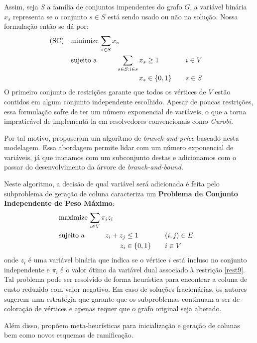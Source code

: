 \documentclass[11pt]{article}
\begin{document}
Assim, seja \(S\) a família de conjuntos impendentes do grafo \(G\), a variável binária \(x_s\) representa se o conjunto \(s \in S\) está sendo usado ou não na solução. Nossa formulação então se dá por:
\begin{alignat}{4}
\mathrm{(SC)} \quad & \omit\rlap{minimize  $\displaystyle \sum_{s \in S} x_s$} \nonumber \\
& \mbox{sujeito a}&& \quad & \sum_{s \in S: i \in s} x_{s}&\geq 1 & \quad & i \in V \label{rest9} \\
&                 &&   & x_s       & \in \{0,1\} &    & s \in S \nonumber
\end{alignat}
O primeiro conjunto de restrições garante que todos os vértices de \(V\) estão contidos em algum conjunto independente escolhido.
Apesar de poucas restrições, essa formulação sofre de ter um número exponencial de variáveis, o que a torna impraticável de implementá-la em resolvedores convencionais como \emph{Gurobi}.

Por tal motivo, \textcite{Mehrotra1996ColumnGenerationApproach} propuseram um algoritmo de \emph{branch-and-price} baseado nesta modelagem.
Essa abordagem permite lidar com um número exponencial de variáveis, já que iniciamos com um subconjunto destas e adicionamos com o passar do desenvolvimento da árvore de \emph{branch-and-bound}.

Neste algoritmo, a decisão de qual variável será adicionada é feita pelo subproblema de geração de coluna caracteriza um \textbf{Problema de Conjunto Independente de Peso Máximo}:
\begin{alignat*}{4}
& \omit\rlap{maximize  $\displaystyle \sum_{i \in V} \pi_i z_i$} \\
& \mbox{sujeito a}&& \quad & z_i + z_j &\leq 1 & \quad & (i,j) \in E \\
&                 &&   & z_i       & \in \{0,1\} &    & i \in V
\end{alignat*}
onde \(z_i\) é uma variável binária que indica se o vértice \(i\) está incluso no conjunto independente e \(\pi_i\) é o valor ótimo da variável dual associado à restrição \eqref{rest9}.
Tal problema pode ser resolvido de forma heurística para encontrar a coluna de custo reduzido com valor negativo.
Em caso de soluções fracionárias, os autores sugerem uma estratégia que garante que os subproblemas continuam a ser de coloração de vértices e apenas requer que o grafo original seja alterado.

Além disso, \textcite{Malaguti2011ExactApproachVertex} propõem meta-heurísticas para inicialização e geração de colunas bem como novos esquemas de ramificação.
\end{document}
